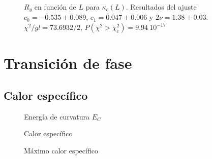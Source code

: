 \begin{figure}[h]
  \centering
  
  \caption{$R_g$ en función de $L$ para $\kappa_c(L)$. Resultados del ajuste
    $c_0=-0.535 \pm 0.089$, $c_1=0.047\pm 0.006$ y $2\nu=1.38\pm
    0.03$. $\chi^2/gl=73.6932/2$, $P(\chi^2>\chi_c^2)=9.94 \ 10^{-17}$}\label{Rg2_transicion}







\end{figure}

\clearpage

\section{Transición de fase}

\subsection{Calor específico}

\begin{figure}[h]
\centering
 
\caption{Energía de curvatura $E_C$}
\end{figure}

\begin{figure}[h]
  \centering
  
  \caption{Calor específico}
\end{figure}

\begin{figure}[h]
  \centering
  
  \caption{Máximo calor específico}
\end{figure}

